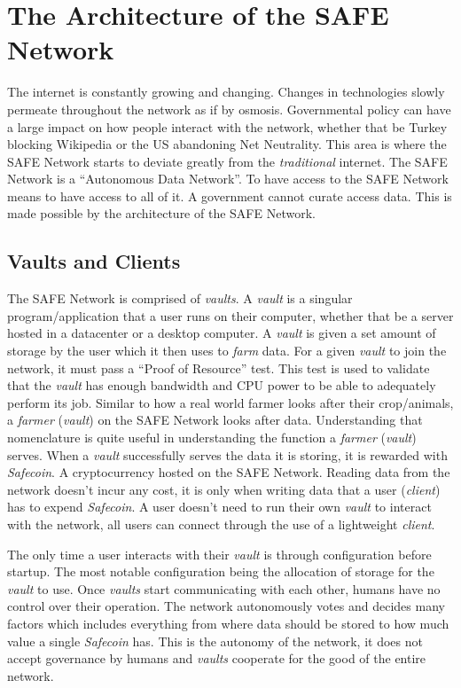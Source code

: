 \chapter{The Architecture of the SAFE Network}
\label{ch:architecture}

The internet is constantly growing and changing. Changes in technologies slowly permeate throughout the network as if by osmosis. Governmental policy can have a large impact on how people interact with the network, whether that be Turkey blocking Wikipedia\cite{turkey} or the US abandoning Net Neutrality. This area is where the SAFE Network starts to deviate greatly from the \textit{traditional} internet. The SAFE Network is a ``Autonomous Data Network''. To have access to the SAFE Network means to have access to all of it. A government cannot curate access data. This is made possible by the architecture of the SAFE Network.

\section{Vaults and Clients}

The SAFE Network is comprised of \textit{vaults}. A \textit{vault} is a singular program/application that a user runs on their computer, whether that be a server hosted in a datacenter or a desktop computer. A \textit{vault} is given a set amount of storage by the user which it then uses to \textit{farm} data. For a given \textit{vault} to join the network, it must pass a ``Proof of Resource'' test. This test is used to validate that the \textit{vault} has enough bandwidth and CPU power to be able to adequately perform its job. Similar to how a real world farmer looks after their crop/animals, a \textit{farmer} (\textit{vault}) on the SAFE Network looks after data. Understanding that nomenclature is quite useful in understanding the function a \textit{farmer} (\textit{vault}) serves. When a \textit{vault} successfully serves the data it is storing, it is rewarded with \textit{Safecoin}. A cryptocurrency hosted on the SAFE Network. Reading data from the network doesn't incur any cost, it is only when writing data that a user (\textit{client}) has to expend \textit{Safecoin}. A user doesn't need to run their own \textit{vault} to interact with the network, all users can connect through the use of a lightweight \textit{client}.

The only time a user interacts with their \textit{vault} is through configuration before startup. The most notable configuration being the allocation of storage for the \textit{vault} to use. Once \textit{vaults} start communicating with each other, humans have no control over their operation. The network autonomously votes and decides many factors which includes everything from where data should be stored to how much value a single \textit{Safecoin} has. This is the autonomy of the network, it does not accept governance by humans and \textit{vaults} cooperate for the good of the entire network.

